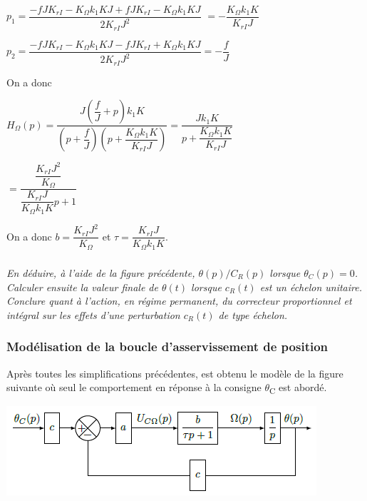 \documentclass[10pt,fleqn]{article} %
\begin{document}
\begin{multicols}{2}
\begin{corrige}
$p_{1} = \dfrac{-fJ K_{rI}-K_{\Omega}k_{1}KJ + fJ K_{rI}-K_{\Omega}k_{1}KJ}{2 K_{rI}J^2}$
$= -\dfrac{K_{\Omega}k_{1}K }{ K_{rI}J}$


$p_{2} = \dfrac{-fJ K_{rI}-K_{\Omega}k_{1}KJ -fJ K_{rI}+K_{\Omega}k_{1}KJ}{2 K_{rI}J^2}= -\dfrac{f }{J}$

On a donc 

$H_{\Omega}(p)=\dfrac{J\left( \dfrac{f}{J} + p \right)k_{1}K}{\left(p+\dfrac{f }{J} \right)\left(p+\dfrac{K_{\Omega}k_{1}K }{ K_{rI}J} \right)}=\dfrac{Jk_{1}K}{p+\dfrac{K_{\Omega}k_{1}K }{ K_{rI}J} }$

$=\dfrac{\dfrac{ K_{rI}J^2}{K_{\Omega} } }{\dfrac{ K_{rI}J}{K_{\Omega}k_{1}K }p+1 }$

On a donc $b=\dfrac{ K_{rI}J^2}{K_{\Omega} }$ et $\tau =\dfrac{ K_{rI}J}{K_{\Omega}k_{1}K }$.
\end{corrige}
\else
\fi

\subparagraph{}\textit{En déduire, à l'aide de la figure précédente, $\theta(p)/C_R(p)$
  lorsque $\theta_C(p)=0$. Calculer ensuite la valeur finale
  de $\theta(t)$ lorsque $c_R(t)$ est un échelon unitaire. %
  Conclure quant à l'action, en régime permanent, du correcteur
  proportionnel et intégral sur les effets d'une perturbation
  $c_R(t)$ de type échelon.}

\ifprof
\begin{corrige}
\end{corrige}
\else
\fi

\subsubsection*{Modélisation de la boucle d'asservissement de position}

Après toutes les simplifications précédentes, est obtenu le modèle de la
figure suivante où seul le comportement en réponse à la consigne
$\theta$\textsubscript{C} est abordé.


\begin{center}
\includegraphics[width=\linewidth]{images/image15.png}


\end{center}
\end{multicols}
\end{document}

